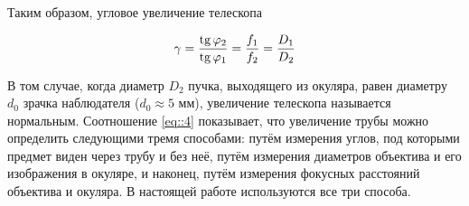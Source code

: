 Таким образом, угловое увеличение телескопа

\begin{equation}\label{eq::4}
  \gamma = \frac{\mathop{\mathrm{tg}}\nolimits \varphi_2}{\mathop{\mathrm{tg}}\nolimits \varphi_1} = \frac{f_1}{f_2}  = \frac{D_1}{D_2}
\end{equation}

В том случае, когда диаметр $D_2$ пучка, выходящего из окуляра, равен диаметру $d_0$ 
зрачка наблюдателя ($d_0 \approx 5$ мм), увеличение телескопа называется нормальным.
Соотношение \eqref{eq::4} показывает, что увеличение трубы можно определить следующими 
тремя способами: путём измерения углов, под которыми предмет виден через трубу и без неё, 
путём измерения диаметров объектива и его изображения в окуляре, и наконец, путём 
измерения фокусных расстояний объектива и окуляра. В настоящей работе используются
все три способа.

